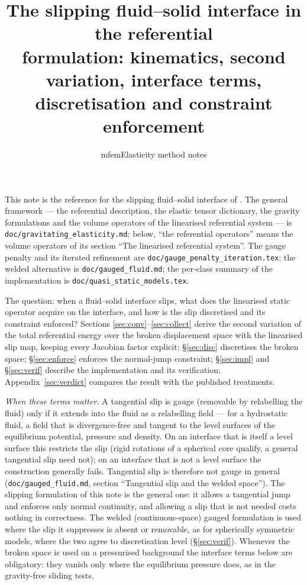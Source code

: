 \documentclass[11pt]{article}
\title{The slipping fluid--solid interface in the referential\\
       formulation: kinematics, second variation, interface terms,\\
       discretisation and constraint enforcement}
\author{mfemElasticity method notes}
\date{}
\begin{document}
\maketitle
\sloppy

\noindent
This note is the reference for the slipping fluid--solid interface of
\texttt{}. The
general framework --- the referential description, the elastic tensor
dictionary, the gravity formulations and the volume operators of the
linearised referential system --- is
\texttt{doc/gravitating\_elasticity.md}; below, ``the referential
operators'' means the volume operators of its section ``The linearised
referential system''. The gauge penalty and its iterated refinement are
\texttt{doc/gauge\_penalty\_iteration.tex}; the welded alternative is
\texttt{doc/gauged\_fluid.md}; the per-class summary of the
implementation is \texttt{doc/quasi\_static\_models.tex}.

The question: when a fluid--solid interface slips, what does the
linearised static operator acquire on the interface, and how is the
slip discretised and its constraint enforced? Sections
\ref{sec:conv}--\ref{sec:collect} derive the second variation of the
total referential energy over the broken displacement space with the
linearised slip map, keeping every Jacobian factor explicit;
\S\ref{sec:disc} discretises the broken space; \S\ref{sec:enforce}
enforces the normal-jump constraint; \S\ref{sec:impl} and
\S\ref{sec:verif} describe the implementation and its verification;
Appendix~\ref{sec:verdict} compares the result with the published
treatments.

\emph{When these terms matter.} A tangential slip is gauge (removable
by relabelling the fluid) only if it extends into the fluid as a
relabelling field --- for a hydrostatic fluid, a field that is
divergence-free and tangent to the level surfaces of the equilibrium
potential, pressure and density. On an interface that is itself a level
surface this restricts the slip (rigid rotations of a spherical core
qualify, a general tangential slip need not); on an interface that is
not a level surface the construction generally fails. Tangential slip
is therefore not gauge in general (\texttt{doc/gauged\_fluid.md},
section ``Tangential slip and the welded space''). The slipping
formulation of this note is the general one: it allows a tangential
jump and enforces only normal continuity, and allowing a slip that is
not needed costs nothing in correctness. The welded (continuous-space)
gauged formulation is used where the slip it suppresses is absent or
removable, as for spherically symmetric models, where the two agree to
discretisation level (\S\ref{sec:verif}). Whenever the broken space is
used on a pressurised background the interface terms below are
obligatory: they vanish only where the equilibrium pressure does, as in
the gravity-free sliding tests.
\end{document}
